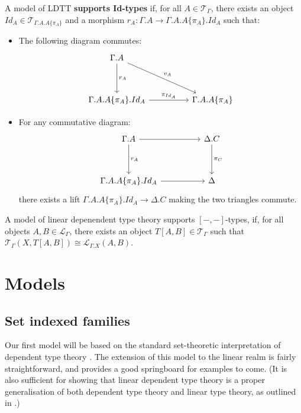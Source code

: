 \begin{defn}[Id-types]
  A model of LDTT \textbf{supports Id-types} if, for all $A \in \mathcal{T}_{\Gamma}$, there exists an object $Id_A \in \mathcal{T}_{\Gamma.A.A\{\pi_A\}}$ and a morphism $r_A : \Gamma.A \to \Gamma.A.A\{\pi_A\}.Id_{A}$ such that:
  \begin{itemize}
    \item The following diagram commutes:
  \[
    \ti
    \Gamma.A \ar[d, "r_A"] \ar[rd, "v_A"]\\
    \Gamma.A.A\{\pi_A\}.Id_A \ar[r, "\pi_{Id_A}"] & \Gamma.A.A\{\pi_A\}
    \kz
  \]
\item For any commutative diagram:
  \[
    \ti
    \Gamma.A \ar[d, "r_A"] \ar[r] & \Delta.C \ar[d, "\pi_C"]\\
    \Gamma.A.A\{\pi_A\}.Id_A \ar[r] & \Delta
    \kz
  \]
  there exists a lift $\Gamma.A.A\{\pi_A\}.Id_A \to \Delta.C$ making the two triangles commute.
\end{itemize}
\begin{defn}
  A model of linear depenendent type theory supports $[-,-]$-types, if, for all objects $A, B \in \mathcal{L}_{\Gamma}$, there exists an object $T[A, B] \in \mathcal{T}_{\Gamma}$ such that $\mathcal{T}_{\Gamma}(X, T[A, B]) \cong \mathcal{L}_{\Gamma.X}(A, B)$.
\end{defn}

\end{defn}

\newpage
\section{Models}
\subsection{Set indexed families}
Our first model will be based on the standard set-theoretic interpretation of dependent type theory \cite{hofmann1997syntax}. The extension of this model to the linear realm is fairly straightforward, and provides a good springboard for examples to come. (It is also sufficient for showing that linear dependent type theory is a proper generalisation of both dependent type theory and linear type theory, as outlined in \cite{vakar14}.)

